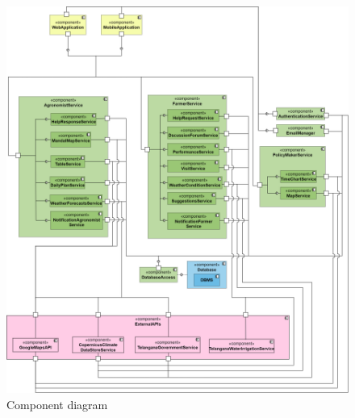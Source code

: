 \newpage

\begin{center}
    \begin{figure}[h!]
  \includegraphics[width=\textwidth,height=\textheight,keepaspectratio]{./Images/Component diagram.png}
  \caption{Component diagram}
\end{figure}
\end{center}

